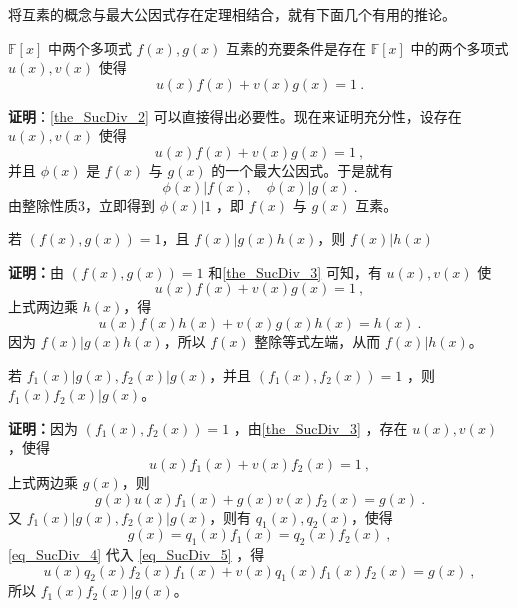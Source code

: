 将互素的概念与最大公因式存在定理相结合，就有下面几个有用的推论。
\begin{theorem}{}\label{the_SucDiv_3}
$\mathbb{F}[x]$ 中两个多项式 $f(x),g(x)$ 互素的充要条件是存在 $\mathbb{F}[x]$ 中的两个多项式 $u(x),v(x)$ 使得
\begin{equation}
u(x)f(x)+v(x)g(x)=1~.
\end{equation}
\end{theorem}
\textbf{证明}：\autoref{the_SucDiv_2} 可以直接得出必要性。现在来证明充分性，设存在 $u(x),v(x)$ 使得 
\begin{equation}
u(x)f(x)+v(x)g(x)=1~,
\end{equation}
并且 $\phi(x)$ 是 $f(x)$ 与 $g(x)$ 的一个最大公因式。于是就有
\begin{equation}
\phi(x)|f(x),\quad \phi(x)|g(x)~.
\end{equation}
由整除性质3，立即得到 $\phi(x)|1$ ，即 $f(x)$ 与 $g(x)$ 互素。
\begin{theorem}{}\label{the_SucDiv_4}
若 $(f(x),g(x))=1$，且 $f(x)|g(x)h(x)$，则 $f(x)|h(x)$
\end{theorem}
\textbf{证明：}由 $(f(x),g(x))=1$ 和\autoref{the_SucDiv_3} 可知，有 $u(x),v(x)$ 使
\begin{equation}
u(x)f(x)+v(x)g(x)=1~,
\end{equation}
上式两边乘 $h(x)$，得
\begin{equation}
u(x)f(x)h(x)+v(x)g(x)h(x)=h(x)~.
\end{equation}
因为 $f(x)|g(x)h(x)$，所以 $f(x)$ 整除等式左端，从而 $f(x)|h(x)$。
\begin{theorem}{}
若 $f_1(x)|g(x),f_2(x)|g(x)$，并且 $(f_1(x),f_2(x))=1$ ，则 $f_1(x)f_2(x)|g(x)$。
\end{theorem}
\textbf{证明：}因为 $(f_1(x),f_2(x))=1$ ，由\autoref{the_SucDiv_3} ，存在 $u(x),v(x)$ ，使得
\begin{equation}
u(x)f_1(x)+v(x)f_2(x)=1~,
\end{equation}
上式两边乘 $g(x)$，则
\begin{equation}\label{eq_SucDiv_5}
g(x)u(x)f_1(x)+g(x)v(x)f_2(x)=g(x)~.
\end{equation}
又 $f_1(x)|g(x),f_2(x)|g(x)$，则有 $q_1(x),q_2(x)$，使得
\begin{equation}\label{eq_SucDiv_4}
g(x)=q_1(x)f_1(x)=q_2(x)f_2(x)~,
\end{equation}
\autoref{eq_SucDiv_4} 代入 \autoref{eq_SucDiv_5} ，得
\begin{equation}
u(x)q_2(x)f_2(x)f_1(x)+v(x)q_1(x)f_1(x)f_2(x)=g(x)~,
\end{equation}
所以 $f_1(x)f_2(x)|g(x)$。
